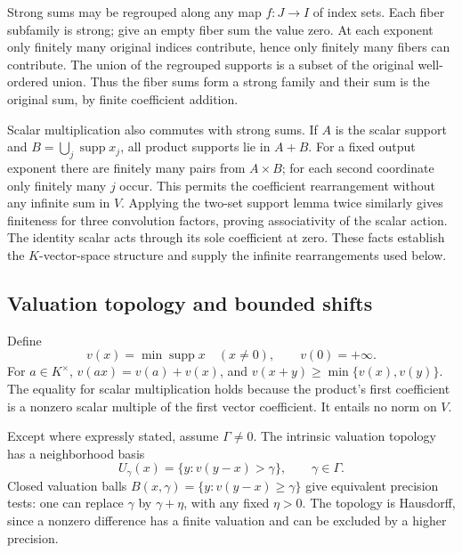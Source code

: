 \documentclass[11pt,letterpaper]{article}
\numberwithin{equation}{section}
\theoremstyle{definition}
\theoremstyle{remark}
\newcommand{\supp}{\operatorname{supp}}
\begin{document}
Strong sums may be regrouped along any map $f:J\to I$ of index sets.
Each fiber subfamily is strong; give an empty fiber sum the value zero.
At each exponent only finitely many original indices contribute, hence
only finitely many fibers can contribute. The union of the regrouped
supports is a subset of the original well-ordered union. Thus the fiber
sums form a strong family and their sum is the original sum, by finite
coefficient addition.

Scalar multiplication also commutes with strong sums. If $A$ is the
scalar support and $B=\bigcup_j\supp x_j$, all product supports lie in
$A+B$. For a fixed output exponent there are finitely many pairs from
$A\times B$; for each second coordinate only finitely many $j$ occur.
This permits the coefficient rearrangement without any infinite sum in
$V$. Applying the two-set support lemma twice similarly gives finiteness
for three convolution factors, proving associativity of the scalar
action. The identity scalar acts through its sole coefficient at zero.
These facts establish the $K$-vector-space structure and supply the
infinite rearrangements used below.

\subsection{Valuation topology and bounded shifts}
Define
\[
 v(x)=\min\supp x\quad(x\ne0),\qquad v(0)=+\infty.
\]
For $a\in K^\times$,
$v(ax)=v(a)+v(x)$, and
$v(x+y)\ge\min\{v(x),v(y)\}$. The equality for scalar multiplication
holds because the product's first coefficient is a nonzero scalar
multiple of the first vector coefficient. It entails no norm on $V$.

Except where expressly stated, assume $\Gamma\ne0$. The intrinsic
valuation topology has a neighborhood basis
\[
 U_\gamma(x)=\{y:v(y-x)>\gamma\},\qquad\gamma\in\Gamma.
\]
Closed valuation balls
$B(x,\gamma)=\{y:v(y-x)\ge\gamma\}$ give equivalent precision tests:
one can replace $\gamma$ by $\gamma+\eta$, with any fixed $\eta>0$.
The topology is Hausdorff, since a nonzero difference has a finite
valuation and can be excluded by a higher precision.
\end{document}
